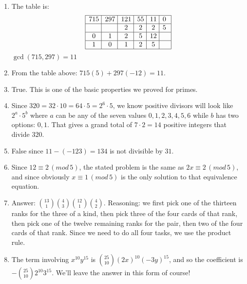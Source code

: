 \begin{enumerate}
\medskip

\item

\medskip

 The table is:
\[
\vbox{\offinterlineskip
\halign{\strut \vrule \hskip .5em \hss $#$ \hss & 
\vrule \hskip .5em \hss $#$ \hss & 
\vrule \hskip .5em \hss $#$ \hss & 
\vrule \hskip .5em \hss $#$ \hss &  
\vrule \hskip .5em \hss $#$ \hss & 
\vrule \hskip .5em \hss $#$ \hss\kern 4pt\vrule
 \cr
\noalign{\hrule}
715&297&121&55&11&0\cr
\noalign{\hrule}
 &&2&2&2&5\cr
\noalign{\hrule}
0&1&2&5&12&\cr
\noalign{\hrule}
1&0&1&2&5&\cr
\noalign{\hrule}
}}
\]
 $\gcd(715,297) = 11$

\item From the table above: $715(5) + 297(-12) = 11$.

\medskip 


\item True. This is one of the basic properties we proved for primes.

\medskip

\item Since $320 = 32\cdot 10 = 64\cdot 5 = 2^6\cdot 5$, we know positive divisors will look
like $2^a\cdot5^b$ where $a$ can be any of the seven values $0,1,2,3,4,5,6$ while $b$ has two
options: $0,1$. That gives a grand total of $7\cdot2 = 14$ positive integers that divide $320$.

\medskip

\item False since $11-(-123) = 134$ is not divisible by $31$. 

\medskip

\item Since $12\equiv 2\,(mod\,5)$, the stated problem is the same as $2x\equiv 2\,(mod\,5)$,
and since obviously $x\equiv 1\,(mod\,5)$ is the only solution to that equivalence equation.

\medskip

\item Answer: $\displaystyle \binom{13}{1}\binom{4}{3}\binom{12}{1}\binom{4}{2}$. Reasoning: we first pick one
of the thirteen ranks for the three of a kind, then pick three of the four cards of that rank, then pick one of the twelve remaining ranks for the pair, then two of the four cards of that rank. Since we need to do all four tasks, we use the product rule. 


\medskip


\item The term involving $x^{10}y^{15}$ is $\displaystyle \binom{25}{10}(2x)^{10}(-3y)^{15}$, and so the
coefficient is $\displaystyle -\binom{25}{10}2^{10}3^{15}$. We'll leave the answer in this form of course!



\end{enumerate}
